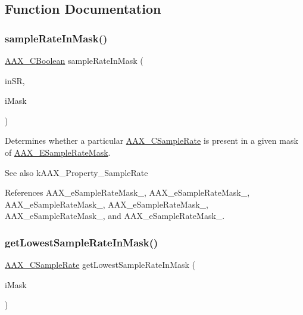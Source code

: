 \subsection{Function Documentation}
\mbox{\label{a00392_adec37d03995016a9e25490d5785f0d8b}} 
\subsubsection{\texorpdfstring{sampleRateInMask()}{sampleRateInMask()}}
{\footnotesize\ttfamily \mbox{\hyperlink{a00392_aa216506530f1d19a2965931ced2b274b}{A\+A\+X\+\_\+\+C\+Boolean}} sample\+Rate\+In\+Mask (\begin{DoxyParamCaption}\item[{\mbox{\hyperlink{a00392_a3d9eea08f47e0b0a23432e15baa4e885}{A\+A\+X\+\_\+\+C\+Sample\+Rate}}}]{in\+SR,  }\item[{uint32\+\_\+t}]{i\+Mask }\end{DoxyParamCaption})\hspace{0.3cm}{\ttfamily [inline]}}



Determines whether a particular \mbox{\hyperlink{a00392_a3d9eea08f47e0b0a23432e15baa4e885}{A\+A\+X\+\_\+\+C\+Sample\+Rate}} is present in a given mask of \mbox{\hyperlink{a00491_a5bb98259de21d2c4d04a2d6010d757c7}{A\+A\+X\+\_\+\+E\+Sample\+Rate\+Mask}}. 

\begin{DoxySeeAlso}{See also}
k\+A\+A\+X\+\_\+\+Property\+\_\+\+Sample\+Rate 
\end{DoxySeeAlso}


References A\+A\+X\+\_\+e\+Sample\+Rate\+Mask\+\_, A\+A\+X\+\_\+e\+Sample\+Rate\+Mask\+\_, A\+A\+X\+\_\+e\+Sample\+Rate\+Mask\+\_, A\+A\+X\+\_\+e\+Sample\+Rate\+Mask\+\_, A\+A\+X\+\_\+e\+Sample\+Rate\+Mask\+\_, and A\+A\+X\+\_\+e\+Sample\+Rate\+Mask\+\_.

\mbox{\label{a00392_a7ed6789141267c2270b49ef9a38bd55a}} 
\subsubsection{\texorpdfstring{getLowestSampleRateInMask()}{getLowestSampleRateInMask()}}
{\footnotesize\ttfamily \mbox{\hyperlink{a00392_a3d9eea08f47e0b0a23432e15baa4e885}{A\+A\+X\+\_\+\+C\+Sample\+Rate}} get\+Lowest\+Sample\+Rate\+In\+Mask (\begin{DoxyParamCaption}\item[{uint32\+\_\+t}]{i\+Mask }\end{DoxyParamCaption})\hspace{0.3cm}{\ttfamily [inline]}}



